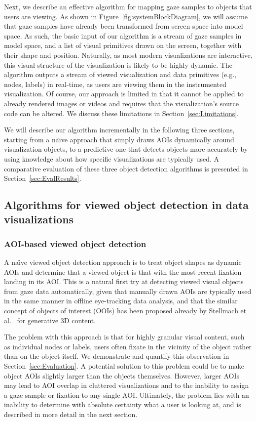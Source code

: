 Next, we describe an effective algorithm for mapping gaze samples to objects that users are viewing. As shown in Figure~\ref{fig:systemBlockDiagram}, we will assume that gaze samples have already been transformed from screen space into model space. As such, the basic input of our algorithm is a stream of gaze samples in model space, and a list of visual primitives drawn on the screen, together with their shape and position. Naturally, as most modern visualizations are interactive, this visual structure of the visualization is likely to be highly dynamic. The algorithm outputs a stream of viewed visualization and data primitives (e.g., nodes, labels) in real-time, as users are viewing them in the instrumented visualization. Of course, our approach is limited in that it cannot be applied to already rendered images or videos and requires that the visualization's source code can be altered. We discuss these limitations in Section~\ref{sec:Limitations}.

We will describe our algorithm incrementally in the following three sections, starting from a na\"{\i}ve approach that simply draws AOIs dynamically around visualization objects, to a predictive one that detects objects more accurately by using knowledge about how specific visualizations are typically used.  A comparative evaluation of these three object detection algorithms is presented in Section~\ref{sec:EvalResults}.

\subsection{Algorithms for viewed object detection in data visualizations}
\label{sec:MethodsAlgorithmsViewedObjectDetection}
\subsubsection{AOI-based viewed object detection}
\label{sec:AOIBasedViewedObjectDetection}
A na\"{\i}ve viewed object detection approach is to treat object shapes as dynamic AOIs and determine that a viewed object is that with the most recent fixation landing in its AOI. This is a natural first try at detecting viewed visual objects from gaze data automatically, given that manually drawn AOIs are typically used in the same manner in offline eye-tracking data analysis, and that the similar concept of objects of interest (OOIs) has been proposed already by Stellmach et al.~\cite{stellmach20103d} for generative 3D content.

The problem with this approach is that for highly granular visual content, such as individual nodes or labels, users often fixate in the vicinity of the object rather than on the object itself. We demonstrate and quantify this observation in Section~\ref{sec:Evaluation}. A potential solution to this problem could be to make object AOIs slightly larger than the objects themselves. However, larger AOIs may lead to AOI overlap in cluttered visualizations and to the inability to assign a gaze sample or fixation to any single AOI. Ultimately, the problem lies with an inability to determine with absolute certainty what a user is looking at, and is described in more detail in the next section.

